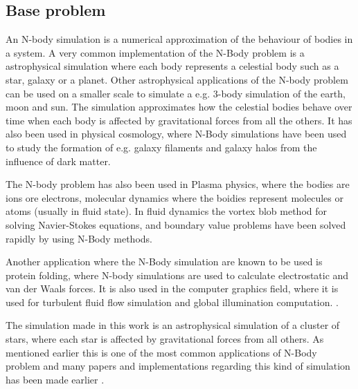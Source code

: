 \subsection{Base problem}
An N-body simulation is a numerical approximation of the behaviour of bodies in a system. A very common implementation of the N-Body problem is a astrophysical simulation where each body represents a celestial body such as a star, galaxy or a planet. Other astrophysical applications of the N-body problem can be used on a smaller scale to simulate a e.g. 3-body simulation of the earth, moon and sun. The simulation approximates how the celestial bodies behave over time when each body is affected by gravitational forces from all the others. It has also been used in physical cosmology, where N-Body simulations have been used to study the formation of e.g. galaxy filaments and galaxy halos from the influence of dark matter.

The N-body problem has also been used in Plasma physics, where the bodies are ions ore electrons, molecular dynamics where the boidies represent molecules or atoms (usually in fluid state). In fluid dynamics the vortex blob method for solving Navier-Stokes equations, and boundary value problems have been solved rapidly by using N-Body methods. \cite{greengard1988rapid}

Another application where the N-Body simulation are known to be used is protein folding, where N-body simulations are used to calculate electrostatic and van der
Waals forces. It is also used in the computer graphics field, where it is used for turbulent fluid flow simulation and global illumination computation. \cite{nyland2007fast}.

The simulation made in this work is an astrophysical simulation of a cluster of stars, where each star is affected by gravitational forces from all others. As mentioned earlier this is one of the most common applications of N-Body problem and many papers and implementations regarding this kind of simulation has been made earlier \cite{aarseth2003gravitational}\cite{burtscher2011efficient}\cite{nyland2007fast}. 

